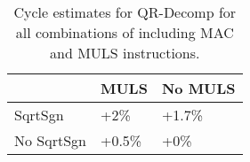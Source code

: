 \begin{table}[ht]
\centering
\begin{tabular}{lll}
  \hline
  & MULS & No MULS \\ 
  \hline
SqrtSgn & +2\% & +1.7\% \\ 
  No SqrtSgn & +0.5\% & +0\% \\ 
   \hline
\end{tabular}
\caption{Cycle estimates for QR-Decomp for all combinations of including MAC and MULS instructions.} 
\label{tab:instruction}
\end{table}